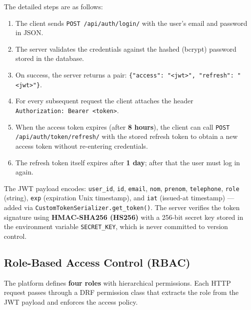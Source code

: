 \documentclass[12pt,a4paper,twoside]{report}
\begin{document}
The detailed steps are as follows:
\begin{enumerate}
  \item The client sends \texttt{POST /api/auth/login/} with the user's email and password in JSON.
  \item The server validates the credentials against the hashed (bcrypt) password stored in the database.
  \item On success, the server returns a pair: \texttt{\{"access":\,"\allowbreak<jwt>",\,"refresh":\,"\allowbreak<jwt>"\}}.
  \item For every subsequent request the client attaches the header \texttt{Authorization:\allowbreak\ Bearer\ <token>}.
  \item When the access token expires (after \textbf{8 hours}), the client can call \texttt{POST /api/\allowbreak auth/\allowbreak token/\allowbreak refresh/} with the stored refresh token to obtain a new access token without re-entering credentials.
  \item The refresh token itself expires after \textbf{1 day}; after that the user must log in again.
\end{enumerate}

The JWT payload encodes: \texttt{user\_id}, \texttt{id}, \texttt{email}, \texttt{nom}, \texttt{prenom}, \texttt{telephone}, \texttt{role} (string), \texttt{exp} (expiration Unix timestamp), and \texttt{iat} (issued-at timestamp) — added via \texttt{CustomTokenSerializer.get\_token()}. The server verifies the token signature using \textbf{HMAC-SHA256 (HS256)} with a 256-bit secret key stored in the environment variable \texttt{SECRET\_KEY}, which is never committed to version control.

\subsection{Role-Based Access Control (RBAC)}

The platform defines \textbf{four roles} with hierarchical permissions. Each HTTP request passes through a DRF permission class that extracts the role from the JWT payload and enforces the access policy.
\end{document}
